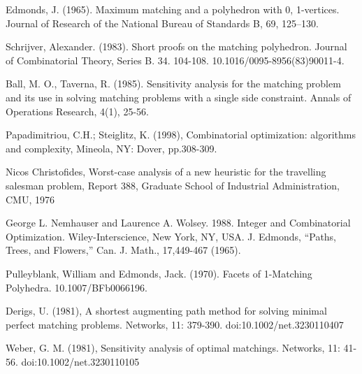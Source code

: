 \documentclass[twoside,a4paper,openright,12pt]{book}
\begin{document}
\begin{thebibliography}{9}
Edmonds, J. (1965). Maximum matching and a polyhedron with 0, 1-vertices. Journal of Research of the National Bureau of Standards B, 69, 125--130. 

 
Schrijver, Alexander. (1983). Short proofs on the matching polyhedron. Journal of Combinatorial Theory, Series B. 34. 104-108. 10.1016/0095-8956(83)90011-4. 
 
Ball, M. O.,  Taverna, R. (1985). Sensitivity analysis for the matching problem and its use in solving matching problems with a single side constraint. Annals of Operations Research, 4(1), 25-56.

Papadimitriou, C.H.; Steiglitz, K. (1998), Combinatorial optimization: algorithms and complexity, Mineola, NY: Dover, pp.308-309.

Nicos Christofides, Worst-case analysis of a new heuristic for the travelling salesman problem, Report 388, Graduate School of Industrial Administration, CMU, 1976

George L. Nemhauser and Laurence A. Wolsey. 1988. Integer and Combinatorial Optimization. Wiley-Interscience, New York, NY, USA.
J. Edmonds, “Paths, Trees, and Flowers,” Can. J. Math., 17,449-467 (1965).

Pulleyblank, William and Edmonds, Jack. (1970). Facets of 1-Matching Polyhedra. 10.1007/BFb0066196. 

Derigs, U. (1981), A shortest augmenting path method for solving minimal perfect matching problems. Networks, 11: 379-390. doi:10.1002/net.3230110407

Weber, G. M. (1981), Sensitivity analysis of optimal matchings. Networks, 11: 41-56. doi:10.1002/net.3230110105
\end{thebibliography}
\end{document}
